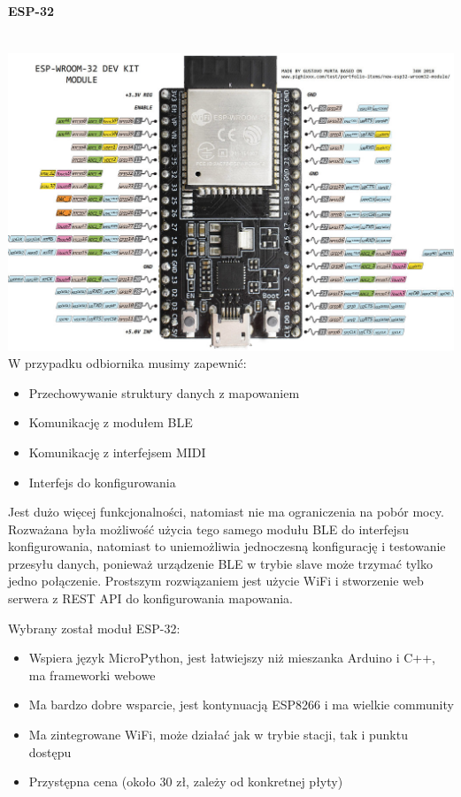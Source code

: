 \documentclass[eng,printmode]{mgr}
\begin{document}
\paragraph{ESP-32}\mbox{} \\
\includegraphics[width=\textwidth]{esp-32-pinout}
W przypadku odbiornika musimy zapewnić:
\begin{itemize}
\item Przechowywanie struktury danych z mapowaniem
\item Komunikację z modułem BLE
\item Komunikację z interfejsem MIDI
\item Interfejs do konfigurowania
\end{itemize}

Jest dużo więcej funkcjonalności, natomiast nie ma ograniczenia na pobór mocy. Rozważana była możliwość użycia tego samego modułu BLE do interfejsu konfigurowania, natomiast to uniemożliwia jednoczesną konfigurację i testowanie przesyłu danych, ponieważ urządzenie BLE w trybie slave może trzymać tylko jedno połączenie. Prostszym rozwiązaniem jest użycie WiFi i stworzenie web serwera z REST API do konfigurowania mapowania.

Wybrany został moduł ESP-32:

\begin{itemize}
\item Wspiera język MicroPython, jest łatwiejszy niż mieszanka Arduino i C++, ma frameworki webowe
\item Ma bardzo dobre wsparcie, jest kontynuacją ESP8266 i ma wielkie community
\item Ma zintegrowane WiFi, może działać jak w trybie stacji, tak i punktu dostępu
\item Przystępna cena (około 30 zł, zależy od konkretnej płyty)
\end{itemize}
\end{document}
